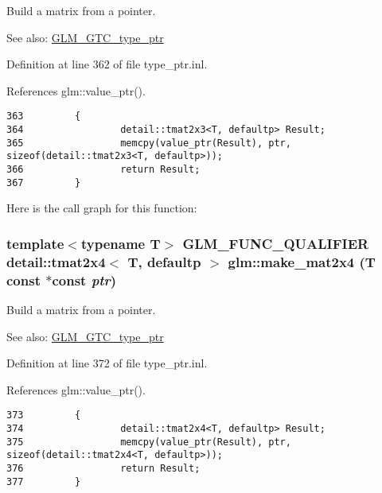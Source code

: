 Build a matrix from a pointer. \begin{Desc}
\item[See also:]\hyperlink{group__gtc__type__ptr}{GLM\_\-GTC\_\-type\_\-ptr} \end{Desc}


Definition at line 362 of file type\_\-ptr.inl.

References glm::value\_\-ptr().

\begin{Code}\begin{verbatim}363         {
364                 detail::tmat2x3<T, defaultp> Result;
365                 memcpy(value_ptr(Result), ptr, sizeof(detail::tmat2x3<T, defaultp>));
366                 return Result;
367         }
\end{verbatim}
\end{Code}




Here is the call graph for this function:\hypertarget{group__gtc__type__ptr_g50245f47c0e6f5a2ab5ce157dc3e97ac}{
\subsubsection[make\_\-mat2x4]{\setlength{\rightskip}{0pt plus 5cm}template$<$typename T$>$ GLM\_\-FUNC\_\-QUALIFIER detail::tmat2x4$<$ T, defaultp $>$ glm::make\_\-mat2x4 (T const $\ast$const  {\em ptr})}}
\label{group__gtc__type__ptr_g50245f47c0e6f5a2ab5ce157dc3e97ac}


Build a matrix from a pointer. \begin{Desc}
\item[See also:]\hyperlink{group__gtc__type__ptr}{GLM\_\-GTC\_\-type\_\-ptr} \end{Desc}


Definition at line 372 of file type\_\-ptr.inl.

References glm::value\_\-ptr().

\begin{Code}\begin{verbatim}373         {
374                 detail::tmat2x4<T, defaultp> Result;
375                 memcpy(value_ptr(Result), ptr, sizeof(detail::tmat2x4<T, defaultp>));
376                 return Result;
377         }
\end{verbatim}
\end{Code}




